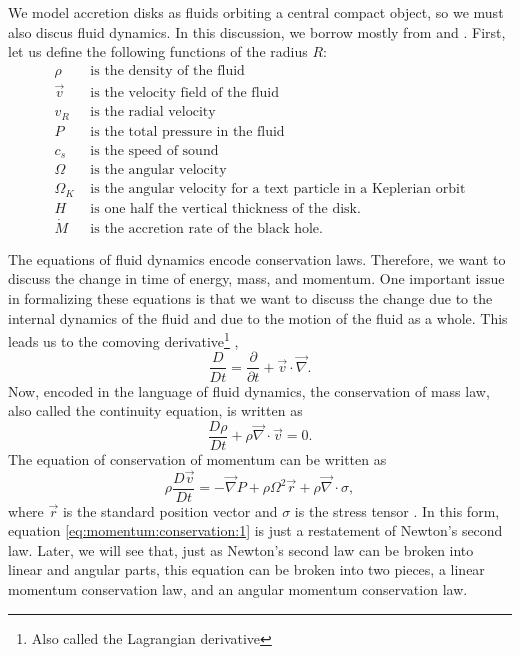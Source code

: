 \documentclass[]{article}
\newcommand{\myvec}[1]{\vec{#1}} %
\newcommand{\pdd}[1]{\frac{\partial}{\partial #1}}
\newcommand{\Dt}[1]{\frac{D #1}{Dt}}
\newcommand{\DDt}{\frac{D}{Dt}}
\begin{document}
We model accretion disks as fluids orbiting a central compact object,
so we must also discus fluid dynamics. In this discussion, we borrow
mostly from \cite{Melia} and \cite{Thompson}. First, let us define the
following functions of the radius $R$:
\begin{eqnarray}
  \label{eq:variable:definitions:1}
  \rho &\text{ is the density of the fluid}\\
  \label{eq:variable:definitions:2}
  \myvec{v}&\text{ is the velocity field of the fluid}\\
    \label{eq:variable:definitions:3}
  v_R &\text{ is the radial velocity}\\
    \label{eq:variable:definitions:4}
  P &\text{ is the total pressure in the fluid}\\
    \label{eq:variable:definitions:5}
  c_s &\text{ is the speed of sound}\\
    \label{eq:variable:definitions:6}
  \Omega &\text{ is the angular velocity}\\
    \label{eq:variable:definitions:7}
  \Omega_K &\text{ is the angular velocity for a text particle in a Keplerian orbit}\\
    \label{eq:variable:definitions:8}
  H &\text{ is one half the vertical thickness of the disk.}\\
    \label{eq:variable:definitions:9}
  \dot{M} &\text{ is the accretion rate of the black hole.}
\end{eqnarray}

The equations of fluid dynamics encode conservation laws. Therefore,
we want to discuss the change in time of energy, mass, and
momentum. One important issue in formalizing these equations is that
we want to discuss the change due to the internal dynamics of the
fluid and due to the motion of the fluid as a whole. This leads us to
the comoving derivative\footnote{Also called the Lagrangian
  derivative} \cite{Thompson},
\begin{equation}
  \label{eq:comoving:derivative}
  \DDt = \pdd{t} + \myvec{v}\cdot\myvec{\nabla}.
\end{equation}
Now, encoded in the language of fluid dynamics, the conservation of
mass law, also called the continuity equation, is written as
\cite{Melia,Thompson}
\begin{equation}
  \label{eq:continuity:1}
  \Dt{\rho} + \rho\myvec{\nabla}\cdot\myvec{v} = 0.
\end{equation}
The equation of conservation of momentum can be written as
\begin{equation}
  \label{eq:momentum:conservation:1}
  \rho \Dt{\myvec{v}} = -\myvec{\nabla} P + \rho \Omega^2 \myvec{r} + \rho \myvec{\nabla}\cdot\sigma,
\end{equation}
where $\myvec{r}$ is the standard position vector and $\sigma$ is the
stress tensor \cite{Melia,Thompson,WikiNavierStokes}. In this form,
equation \eqref{eq:momentum:conservation:1} is just a restatement of
Newton's second law. Later, we will see that, just as Newton's second
law can be broken into linear and angular parts, this equation can be
broken into two pieces, a linear momentum conservation law, and an
angular momentum conservation law.
\end{document}
